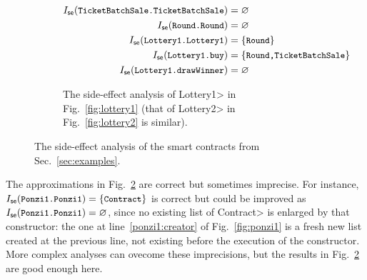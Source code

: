 \begin{example}
\begin{figure}[t]
\begin{center}
    \begin{subfigure}{\textwidth}
      \begin{align*}
        \intsideeffect(\<TicketBatchSale.TicketBatchSale>)&=\varnothing\\
        \intsideeffect(\<Round.Round>)&=\varnothing\\
        \intsideeffect(\<Lottery1.Lottery1>)&=\{\<Round>\}\\
        \intsideeffect(\<Lottery1.buy>)&=\{\<Round,TicketBatchSale>\}\\
        \intsideeffect(\<Lottery1.drawWinner>)&=\varnothing
      \end{align*}
      \caption{The side-effect analysis of \<Lottery1> in Fig.~\ref{fig:lottery1}
        (that of \<Lottery2> in Fig.~\ref{fig:lottery2} is similar).}
      \label{fig:side_effect_lottery1}
    \end{subfigure}
    \end{center}
    \caption{The side-effect analysis of the smart contracts from Sec.~\ref{sec:examples}.}
    \label{fig:side_effect_examples}
  \end{figure}
\end{example}
%
The approximations in Fig.~\ref{fig:side_effect_examples} are correct
but sometimes imprecise. For instance, $\intsideeffect(\<Ponzi1.Ponzi1>)=\{\<Contract>\}$
is correct but could be improved as $\intsideeffect(\<Ponzi1.Ponzi1>)=\varnothing$,
since no existing list of \<Contract> is enlarged by that constructor:
the one at line~\ref{ponzi1:creator} of Fig.~\ref{fig:ponzi1}
is a fresh new list created at the previous line, not existing before the
execution of the constructor. More complex analyses can ovecome these imprecisions,
but the results in Fig.~\ref{fig:side_effect_examples} are good enough here.
